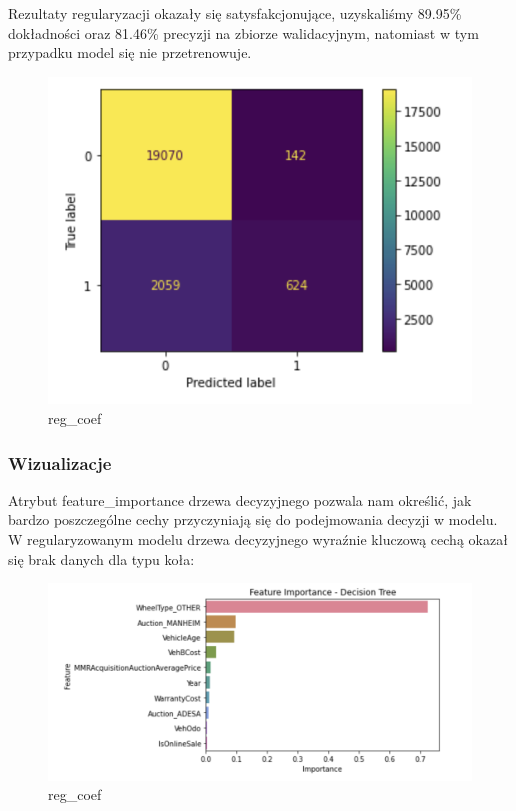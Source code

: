 \documentclass[11pt]{article}
\begin{document}
Rezultaty regularyzacji okazały się satysfakcjonujące, uzyskaliśmy
89.95\% dokładności oraz 81.46\% precyzji na zbiorze walidacyjnym,
natomiast w tym przypadku model się nie przetrenowuje.

\begin{figure}
\centering
\includegraphics{plots/dct_confusion.png}
\caption{reg\_coef}
\end{figure}

\hypertarget{wizualizacje}{%
\subsubsection{Wizualizacje}\label{wizualizacje}}

Atrybut feature\_importance drzewa decyzyjnego pozwala nam określić, jak
bardzo poszczególne cechy przyczyniają się do podejmowania decyzji w
modelu. W regularyzowanym modelu drzewa decyzyjnego wyraźnie kluczową
cechą okazał się brak danych dla typu koła:

\begin{figure}
\centering
\includegraphics{plots/dct_feature_importance.png}
\caption{reg\_coef}
\end{figure}
\end{document}
